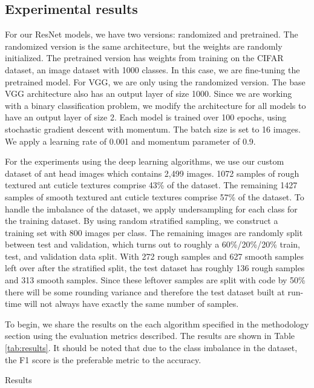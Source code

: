 \documentclass{aci}
\numberwithin{equation}{section}
\begin{document}
\subsection{Experimental results}

For our ResNet models, we have two versions: randomized and pretrained. The
randomized version is the same architecture, but the weights are randomly
initialized. The pretrained version has weights from training on the CIFAR
dataset, an image dataset with 1000 classes. In this case, we are fine-tuning
the pretrained model. For VGG, we are only using the randomized version. The
base VGG architecture also has an output layer of size 1000. Since we are
working with a binary classification problem, we modify the architecture for all
models to have an output layer of size 2. Each model is trained over 100 epochs,
using stochastic gradient descent with momentum. The batch size is set to 16
images. We apply a learning rate of 0.001 and momentum parameter of 0.9.


For the experiments using the deep learning algorithms, we use our custom
dataset of ant head images which contains 2,499 images. 1072 samples of rough
textured ant cuticle textures comprise 43\% of the dataset. The remaining 1427
samples of smooth textured ant cuticle textures comprise 57\% of the dataset. To
handle the imbalance of the dataset, we apply undersampling for each class for
the training dataset. By using random stratified sampling, we construct a
training set with 800 images per class. The remaining images are randomly split
between test and validation, which turns out to roughly a 60\%/20\%/20\% train,
test, and validation data split. With 272 rough samples and 627 smooth samples
left over after the stratified split, the test dataset has roughly 136 rough
samples and 313 smooth samples. Since these leftover samples are split with code
by 50\% there will be some rounding variance and therefore the test dataset
built at run-time will not always have exactly the same number of samples.

To begin, we share the results on the each algorithm specified in the
methodology section using the evaluation metrics described. The results are
shown in Table \ref{tab:results}. It should be noted that due to the class
imbalance in the dataset, the F1 score is the preferable metric to the accuracy.

\begin{table}[h]
    \centering
    \caption{Results}
    
    \label{tab:results}
\end{table}
\end{document}
